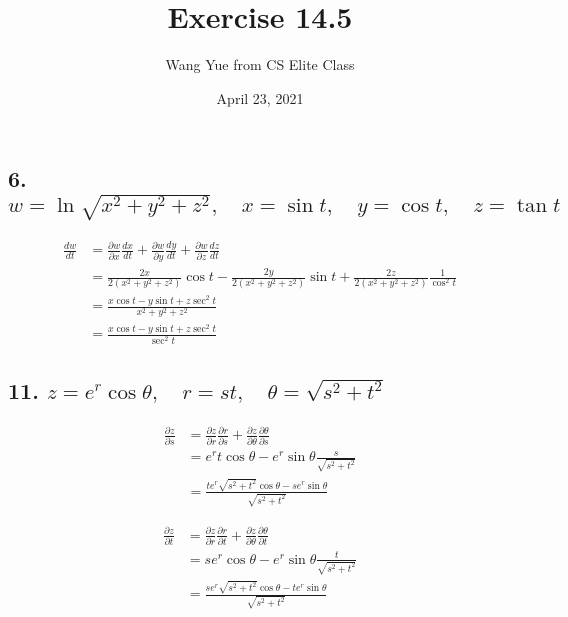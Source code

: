 \documentclass{article}
\begin{document}
    \title{Exercise 14.5}
    \author{Wang Yue from CS Elite Class}
    \date{April 23, 2021}
    \maketitle

    \subsection*{6. $w = \ln \sqrt{x^2+y^2+z^2}, \quad x = \sin t, \quad y = \cos t, \quad z = \tan t$}

    $$\begin{aligned}
        \frac{dw}{dt} &= \frac{\partial w}{\partial x}\frac{dx}{dt} + \frac{\partial w}{\partial y}\frac{dy}{dt} + \frac{\partial w}{\partial z}\frac{dz}{dt} \\
        &= \frac{2x}{2(x^2+y^2+z^2)}\cos t - \frac{2y}{2(x^2+y^2+z^2)}\sin t + \frac{2z}{2(x^2+y^2+z^2)}\frac{1}{\cos^2 t} \\
        &= \frac{x\cos t - y\sin t + z\sec^2 t}{x^2+y^2+z^2} \\
        &= \frac{x\cos t - y\sin t + z\sec^2 t}{\sec^2 t}
    \end{aligned}$$
    
    \subsection*{11. $z = e^r \cos \theta, \quad r = st, \quad \theta = \sqrt{s^2+t^2}$}

    $$\begin{aligned}
        \frac{\partial z}{\partial s} &= \frac{\partial z}{\partial r}\frac{\partial r}{\partial s} + \frac{\partial z}{\partial \theta}\frac{\partial \theta}{\partial s} \\
        &= e^r t \cos \theta -e^r \sin \theta \frac{s}{\sqrt{s^2+t^2}} \\
        &= \frac{te^r \sqrt{s^2+t^2} \cos \theta - se^r \sin \theta}{\sqrt{s^2+t^2}}
    \end{aligned}$$

    $$\begin{aligned}
        \frac{\partial z}{\partial t} &= \frac{\partial z}{\partial r}\frac{\partial r}{\partial t} + \frac{\partial z}{\partial \theta}\frac{\partial \theta}{\partial t} \\
        &= se^r \cos \theta -e^r \sin \theta \frac{t}{\sqrt{s^2+t^2}} \\
        &= \frac{se^r\sqrt{s^2+t^2} \cos \theta - te^r \sin \theta}{\sqrt{s^2+t^2}}
    \end{aligned}$$
\end{document}
